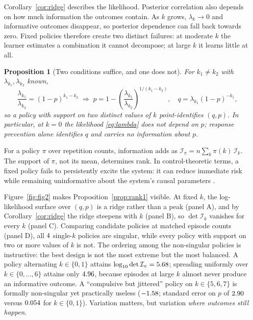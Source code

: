 \documentclass[11pt]{article}
\newtheorem{proposition}{Proposition}
\newcommand{\lamk}{\lambda_k}
\newcommand{\Ifisher}{\mathcal{I}}
\begin{document}
Corollary~\ref{cor:ridge} describes the likelihood. Posterior correlation also
depends on how much information the outcomes contain. As $k$ grows,
$\lamk \to 0$ and informative outcomes disappear, so posterior dependence can
fall back towards zero. Fixed policies therefore create two distinct failures:
at moderate $k$ the learner estimates a combination it cannot decompose; at large
$k$ it learns little at all.

\begin{proposition}[Two conditions suffice, and one does not]
\label{prop:two}
For $k_1 \neq k_2$ with $\lambda_{k_1},\lambda_{k_2}$ known,
\begin{equation}
\frac{\lambda_{k_1}}{\lambda_{k_2}} = (1-p)^{k_1-k_2}
\;\Longrightarrow\;
p = 1 - \left(\frac{\lambda_{k_1}}{\lambda_{k_2}}\right)^{1/(k_1-k_2)},
\quad
q = \lambda_{k_1}(1-p)^{-k_1},
\label{eq:recovery}
\end{equation}
so a policy with support on two distinct values of $k$ point-identifies
$(q,p)$. In particular, at $k=0$ the likelihood \eqref{eq:lambda} does not depend
on $p$; response prevention alone identifies $q$ and carries no information about
$p$.
\end{proposition}

For a policy $\pi$ over repetition counts, information adds as
$\Ifisher_\pi = n\sum_k \pi(k)\,\Ifisher_k$. The support of $\pi$, not its mean,
determines rank. In control-theoretic terms, a fixed policy fails to persistently
excite the system: it can reduce immediate risk while remaining uninformative
about the system's causal parameters \citep{bellman1970structural}.

Figure~\ref{fig:fig2} makes Proposition~\ref{prop:rank1} visible. At fixed $k$,
the log-likelihood surface over $(q,p)$ is a ridge rather than a peak (panel A),
and by Corollary~\ref{cor:ridge} the ridge steepens with $k$ (panel B), so
$\det\Ifisher_k$ vanishes for every $k$ (panel C). Comparing candidate policies
at matched episode counts (panel D), all $4$ single-$k$ policies
are singular, while every policy with support on two or more values of $k$ is
not. The ordering among the non-singular policies is instructive: the best design
is not the most extreme but the most balanced. A policy alternating $k\in\{0,1\}$
attains $\log_{10}\det\Ifisher_\pi = \detBestTwoPoint$; spreading uniformly over
$k\in\{0,\dots,6\}$ attains only $4.96$, because episodes at large $k$
almost never produce an informative outcome. A ``compulsive but jittered'' policy
on $k\in\{5,6,7\}$ is formally non-singular yet practically useless
($-1.58$; standard error on $p$ of $2.90$ versus $0.054$
for $k\in\{0,1\}$). Variation matters, but variation \emph{where outcomes still
happen}.
\end{document}
